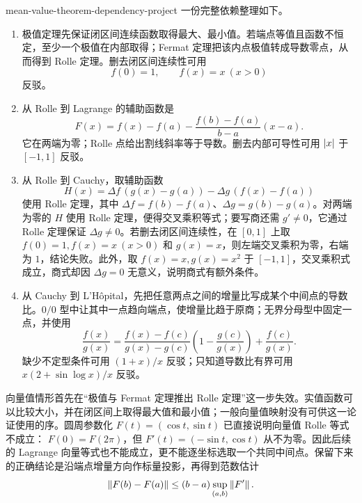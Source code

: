 \begin{solution}{mean-value-theorem-dependency-project}
一份完整依赖整理如下。

\begin{enumerate}
 \item 极值定理先保证闭区间连续函数取得最大、最小值。若端点等值且函数不恒定，至少一个极值在内部取得；Fermat 定理把该内点极值转成导数零点，从而得到 Rolle 定理。删去闭区间连续性可用
 \[
  f(0)=1,\qquad f(x)=x\ (x>0)
 \]
 反驳。
 \item 从 Rolle 到 Lagrange 的辅助函数是
 \[
  F(x)=f(x)-f(a)
  -\frac{f(b)-f(a)}{b-a}(x-a).
 \]
 它在两端为零；Rolle 点给出割线斜率等于导数。删去内部可导性可用 \(\left|x\right|\) 于 \([-1,1]\) 反驳。
 \item 从 Rolle 到 Cauchy，取辅助函数
 \[
  H(x)=\Delta f\,(g(x)-g(a))
       -\Delta g\,(f(x)-f(a))
 \]
 使用 Rolle 定理，其中
 \(\Delta f=f(b)-f(a)\)、\(\Delta g=g(b)-g(a)\)。对两端为零的 \(H\) 使用 Rolle 定理，便得交叉乘积等式；要写商还需 \(g'\ne0\)，它通过 Rolle 定理保证 \(\Delta g\ne0\)。若删去闭区间连续性，在 \([0,1]\) 上取 \(f(0)=1,f(x)=x\ (x>0)\) 和 \(g(x)=x\)，则左端交叉乘积为零，右端为 \(1\)，结论失败。此外，取 \(f(x)=x,g(x)=x^2\) 于 \([-1,1]\)，交叉乘积式成立，商式却因 \(\Delta g=0\) 无意义，说明商式有额外条件。
 \item 从 Cauchy 到 L'Hôpital，先把任意两点之间的增量比写成某个中间点的导数比。\(0/0\) 型中让其中一点趋向端点，使增量比趋于原商；无界分母型中固定一点，并使用
 \[
  \frac{f(x)}{g(x)}
  =
  \frac{f(x)-f(c)}{g(x)-g(c)}
  \left(1-\frac{g(c)}{g(x)}\right)
  +\frac{f(c)}{g(x)}.
 \]
 缺少不定型条件可用 \((1+x)/x\) 反驳；只知道导数比有界可用
 \(x(2+\sin\log x)/x\) 反驳。
\end{enumerate}

向量值情形首先在“极值与 Fermat 定理推出 Rolle 定理”这一步失效。实值函数可以比较大小，并在闭区间上取得最大值和最小值；一般向量值映射没有可供这一论证使用的序。圆周参数化
\(F(t)=(\cos t,\sin t)\) 已直接说明向量值 Rolle 等式不成立：
\(F(0)=F(2\pi)\)，但 \(F'(t)=(-\sin t,\cos t)\) 从不为零。因此后续的 Lagrange 向量等式也不能成立，更不能逐坐标选取一个共同中间点。保留下来的正确结论是沿端点增量方向作标量投影，再得到范数估计
\[
 \left\lVert F(b)-F(a)\right\rVert
 \le(b-a)\sup_{(a,b)}\left\lVert F'\right\rVert.
\]
\end{solution}
